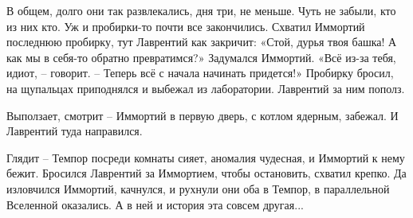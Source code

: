 \documentclass[ebook,oneside,final,openright]{memoir}
\begin{document}
\par
В общем, долго они так развлекались, дня три, не меньше. Чуть не забыли, кто из них кто. Уж и пробирки-то почти все закончились. Схватил Иммортий последнюю пробирку, тут Лаврентий как закричит: «Стой, дурья твоя башка! А как мы в себя-то обратно превратимся?» Задумался Иммортий. «Всё из-за тебя, идиот, – говорит. – Теперь всё с начала начинать придется!» Пробирку бросил, на щупальцах приподнялся и выбежал из лаборатории. Лаврентий за ним пополз.\par
\par
Выползает, смотрит – Иммортий в первую дверь, с котлом ядерным, забежал. И Лаврентий туда направился.\par
\par
Глядит – Темпор посреди комнаты сияет, аномалия чудесная, и Иммортий к нему бежит. Бросился Лаврентий за Иммортием, чтобы остановить, схватил крепко. Да изловчился Иммортий, качнулся, и рухнули они оба в Темпор, в параллельной Вселенной оказались. А в ней и история эта совсем другая...\par
\end{document}
